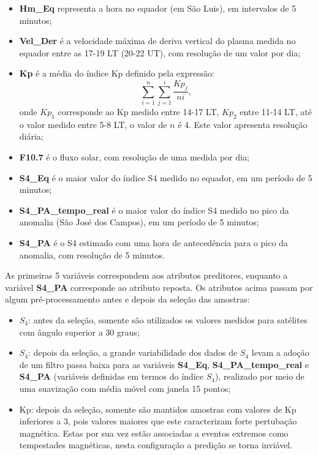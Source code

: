 \begin{itemize}
\item {\bf Hm\_Eq} representa a hora no equador (em São Luis), em intervalos de 5 minutos;
\item {\bf Vel\_Der} é a velocidade máxima de deriva vertical do plasma medida no equador entre as 17-19 LT (20-22 UT), com resolução de um valor por dia;
\item {\bf Kp} é a média do índice Kp definido pela expressão:
\begin{equation}
\sum_{i=1}^{n}\sum_{j=1}^{i}\frac{Kp_{j}}{ni}\mbox{,}~
\end{equation}
onde $Kp_1$ corresponde ao Kp medido entre 14-17 LT, $Kp_2$ entre 11-14 LT, até o valor medido entre 5-8 LT, o valor de $n$ é 4. Este valor apresenta resolução diária;
\item {\bf F10.7} é o fluxo solar, com resolução de uma medida por dia;
\item {\bf S4\_Eq} é o maior valor do índice S4 medido no equador, em um período de 5 minutos;
\item {\bf S4\_PA\_tempo\_real} é o maior valor do índice S4 medido no pico da anomalia (São José dos Campos), em um período de 5 minutos;
\item {\bf S4\_PA} é o S4 estimado com uma hora de antecedência para o pico da anomalia, com resolução de 5 minutos.
\end{itemize}

As primeiras 5 variáveis correspondem aos atributos preditores, enquanto a variável {\bf S4\_PA} corresponde ao atributo reposta. Os atributos acima passam por algum pré-processamento antes e depois da seleção das amostras:

\begin{itemize}
\item $S_4$: antes da seleção, somente são utilizados os valores medidos para satélites com ângulo superior a 30 graus;
\item $S_4$: depois da seleção, a grande variabilidade dos dados de $S_4$ levam a adoção de um filtro passa baixa para as variáveis {\bf S4\_Eq}, {\bf S4\_PA\_tempo\_real} e {\bf S4\_PA} (variáveis definidas em termos do índice $S_4$), realizado por meio de uma suavização com média móvel com janela 15 pontos;
\item Kp: depois da seleção, somente são mantidos amostras com valores de Kp inferiores a 3, pois valores maiores que este caracterizam forte pertubação magnética. Estas por sua vez estão associadas a eventos extremos como tempestades magnéticas, nesta configuração a predição se torna inviável.
\end{itemize}

